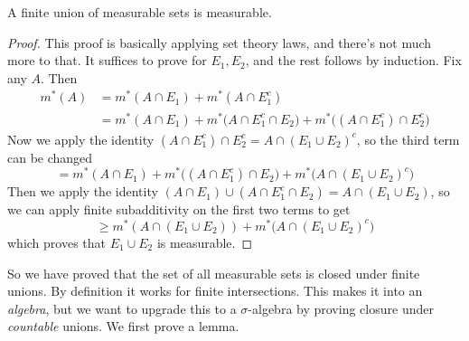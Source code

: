   \begin{lemma}
    \label{thm:finite-unions-are-measurable}
    A finite union of measurable sets is measurable. 
  \end{lemma}
  \begin{proof}
    This proof is basically applying set theory laws, and there's not much more to that. It suffices to prove for $E_1, E_2$, and the rest follows by induction. Fix any $A$. Then 
    \begin{align}
      m^\ast (A) & = m^\ast (A \cap E_1) + m^\ast (A \cap E_1^c) \\ 
                   & = m^\ast (A \cap E_1) + m^\ast \big(A \cap E_1^c \cap E_2 \big) + m^\ast \big((A \cap E_1^c) \cap E_2^c \big)
    \end{align}
    Now we apply the identity $(A \cap E_1^c) \cap E_2^c = A \cap (E_1 \cup E_2)^c$, so the third term can be changed 
    \begin{equation}
      = m^\ast (A \cap E_1) + m^\ast \big((A \cap E_1^c) \cap E_2 \big) + m^\ast \big( A \cap (E_1 \cup E_2)^c \big)
    \end{equation}
    Then we apply the identity $(A \cap E_1) \cup (A \cap E_1^c \cap E_2) = A \cap (E_1 \cup E_2)$, so we can apply finite subadditivity on the first two terms to get 
    \begin{equation}
      \geq m^\ast (A \cap (E_1 \cup E_2)) + m^\ast \big( A \cap (E_1 \cup E_2)^c \big)
    \end{equation}
    which proves that $E_1 \cup E_2$ is measurable. 
  \end{proof} 

  So we have proved that the set of all measurable sets is closed under finite unions. By definition it works for finite intersections. This makes it into an \textit{algebra}, but we want to upgrade this to a $\sigma$-algebra by proving closure under \textit{countable} unions. We first prove a lemma. 

